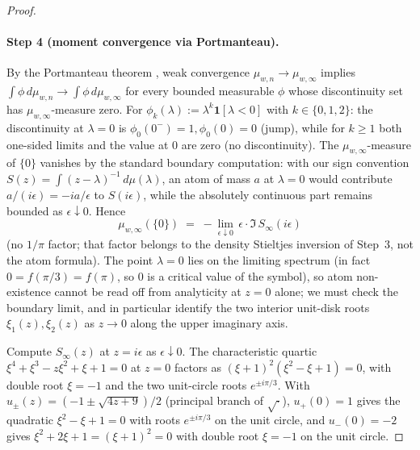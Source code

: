 \begin{proof}
\paragraph{Step 4 (moment convergence via Portmanteau).}
By the Portmanteau theorem \cite{Billingsley1968}, weak convergence
$\mu_{w, n} \to \mu_{w, \infty}$ implies $\int \phi\, d\mu_{w, n} \to
\int \phi\, d\mu_{w, \infty}$ for every bounded measurable $\phi$
whose discontinuity set has $\mu_{w, \infty}$-measure zero. For
$\phi_{k}(\lambda) := \lambda^{k} \mathbf{1}[\lambda < 0]$ with
$k \in \{0, 1, 2\}$: the discontinuity at $\lambda = 0$ is
$\phi_{0}(0^{-}) = 1, \phi_{0}(0) = 0$ (jump), while for $k \ge 1$
both one-sided limits and the value at $0$ are zero (no
discontinuity). The $\mu_{w, \infty}$-measure of $\{0\}$ vanishes by the
standard boundary computation: with our sign convention
$S(z) = \int (z - \lambda)^{-1}\, d\mu(\lambda)$, an atom of mass $a$
at $\lambda = 0$ would contribute $a/(i\epsilon) = -i a/\epsilon$ to
$S(i\epsilon)$, while the absolutely continuous part remains bounded
as $\epsilon \downarrow 0$. Hence
\[
\mu_{w, \infty}(\{0\})
\;=\; -\lim_{\epsilon \downarrow 0}\, \epsilon \cdot
\Im\, S_{\infty}(i\epsilon)
\]
(no $1/\pi$ factor; that factor belongs to the density Stieltjes
inversion of Step~3, not the atom formula). The point $\lambda = 0$
lies on the limiting spectrum (in fact $0 = f(\pi/3) = f(\pi)$, so
$0$ is a critical value of the symbol), so atom non-existence cannot
be read off from analyticity at $z = 0$ alone; we must check the
boundary limit, and in particular identify the two interior unit-disk
roots $\xi_{1}(z), \xi_{2}(z)$ as $z \to 0$ along the upper imaginary
axis.

Compute $S_{\infty}(z)$ at $z = i\epsilon$ as $\epsilon \downarrow 0$.
The characteristic quartic
$\xi^{4} + \xi^{3} - z\xi^{2} + \xi + 1 = 0$ at $z = 0$ factors as
$(\xi+1)^{2}(\xi^{2} - \xi + 1) = 0$, with double root $\xi = -1$ and
the two unit-circle roots $e^{\pm i\pi/3}$. With
$u_{\pm}(z) = (-1 \pm \sqrt{4z + 9})/2$ (principal branch of
$\sqrt{\cdot}$), $u_{+}(0) = 1$ gives the quadratic $\xi^{2} - \xi + 1 = 0$
with roots $e^{\pm i\pi/3}$ on the unit circle, and $u_{-}(0) = -2$
gives $\xi^{2} + 2\xi + 1 = (\xi + 1)^{2} = 0$ with double root
$\xi = -1$ on the unit circle.


\end{proof}
